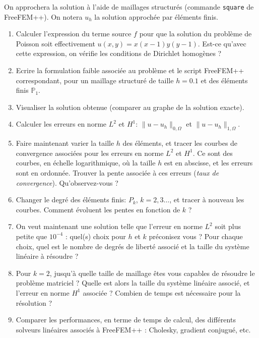 \medskip

On approchera la solution à l'aide de maillages structurés (commande {\tt square} de FreeFEM++). On notera $u_h$ la solution approchée par éléments finis.

\begin{enumerate}

\item Calculer l'expression du terme source $f$ pour que la solution du problème de Poisson soit effectivement $u(x,y) = x(x-1)y(y-1)$. Est-ce qu'avec cette expression, on vérifie les conditions de Dirichlet homogènes ?

\item Ecrire la formulation faible associée au problème et le script FreeFEM++ correspondant, pour un maillage structuré de taille $h=0.1$ et des éléments finis $\mathbb{P}_1$.

\item Visualiser la solution obtenue (comparer au graphe de la solution exacte).

\item Calculer les erreurs en norme $L^2$ et $H^1$:
$\| u - u_h \|_{0,\Omega}$
et
$\| u - u_h \|_{1,\Omega}$.

\item Faire maintenant varier la taille $h$ des éléments, et tracer les courbes de convergence associées pour les erreurs en norme $L^2$ et $H^1$. Ce sont des courbes, en échelle logarithmique, où la taille $h$ est en abscisse, et les erreurs sont en ordonnée. Trouver la pente associée à ces erreurs (\emph{taux de convergence}). Qu'observez-vous ?

\item Changer le degré des éléments finis: $P_k$, $k=2,3\dots$, et tracer à nouveau les courbes. Comment évoluent les pentes en fonction de $k$ ?

\item On veut maintenant une solution telle que l'erreur en norme $L^2$ soit plus petite que $10^{-4}$ : quel(s) choix pour $h$ et $k$ préconisez vous ? Pour chaque choix, quel est le nombre de degrés de liberté associé et la taille du système linéaire à résoudre ?

\item %
Pour $k=2$, jusqu'à quelle taille de maillage êtes vous capables de résoudre le problème matriciel ? Quelle est alors la taille du système linéaire associé, et l'erreur en norme $H^1$ associée ? Combien de temps est nécessaire pour la résolution ?

\item Comparer les performances, en terme de temps de calcul, des différents solveurs linéaires associés à FreeFEM++ : Cholesky, gradient conjugué, etc.


\end{enumerate}

